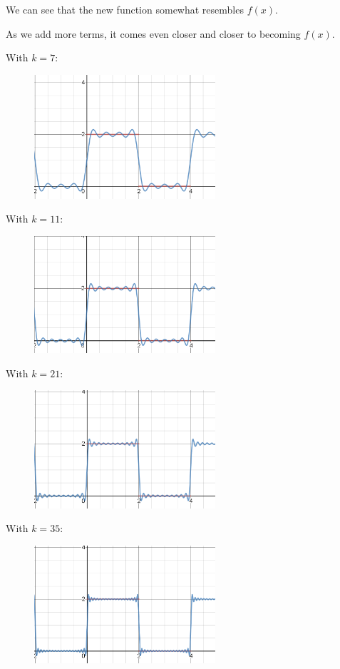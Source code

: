 \documentclass[a4paper]{article}
\begin{document}
We can see that the new function somewhat resembles $f(x)$.

As we add more terms, it comes even closer and closer to becoming $f(x)$.

With $k = 7$:
\begin{figure}[H]
	\centering
	\includegraphics[width=0.6\textwidth]{k=7.png}
\end{figure}

With $k = 11$:
\begin{figure}[H]
	\centering
	\includegraphics[width=0.6\textwidth]{k=11.png}
\end{figure}
\newpage
With $k = 21$:
\begin{figure}[H]
	\centering
	\includegraphics[width=0.6\textwidth]{k=21.png}
\end{figure}

With $k = 35$:
\begin{figure}[H]
	\centering
	\includegraphics[width=0.6\textwidth]{k=35.png}
\end{figure}
\end{document}
